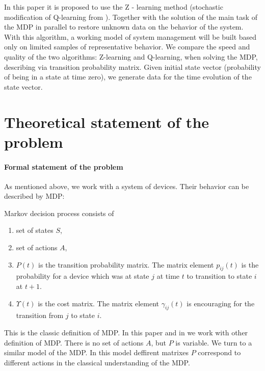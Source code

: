 \documentclass[12pt,twoside]{article}
\begin{document}
In this paper it is proposed to use the Z - learning method (stochastic modification of Q-learning from \cite{Szepesvari,Allen}). Together with the solution of the main task of the MDP in parallel to restore unknown data on the behavior of the system. With this algorithm, a working model of system management will be built based only on limited samples of representative behavior. We compare the speed and quality of the two algorithms: Z-learning and Q-learning, when solving the MDP, describing via transition probability matrix. Given initial state vector (probability of being in a state at time zero), we generate data for the time evolution of the state vector.

\section{Theoretical statement of the problem}

\paragraph{Formal statement of the problem}
As mentioned above, we work with a system of devices. Their behavior can be described by MDP:

\begin{Def}
    Markov decision process consists of 
    \begin{enumerate}
        \item set of states $S$, 
    
        \item set of actions $A$, 
    
        \item $P(t)$ is the transition probability matrix. The matrix element $p_{ij}(t)$ is the probability for a device which was at state $j$ at time $t$ to transition to state $i$ at $t+1$.
    
        \item $\Upsilon(t)$ is the cost matrix. The matrix element $\gamma_{ij}(t)$ is encouraging for the transition from $j$  to state $i$.
    \end{enumerate}
\end{Def}

    This is the classic definition of MDP. In this paper and in \cite{Chertkov} we work with other definition of MDP. There is no set of actions $A$, but $P$ is variable. We turn to a similar model of the MDP. In this model deffirent matrixes $P$ correspond to different actions in the classical understanding of the MDP.
    
\end{document}
